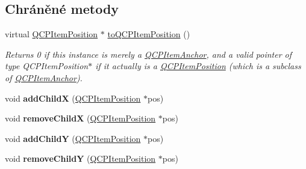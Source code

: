 \subsection*{Chráněné metody}
\begin{DoxyCompactItemize}
\item 
virtual \hyperlink{classQCPItemPosition}{Q\+C\+P\+Item\+Position} $\ast$ \hyperlink{classQCPItemAnchor_ac54b20120669950255a63587193dbb86}{to\+Q\+C\+P\+Item\+Position} ()
\begin{DoxyCompactList}\small\item\em Returns 0 if this instance is merely a \hyperlink{classQCPItemAnchor}{Q\+C\+P\+Item\+Anchor}, and a valid pointer of type Q\+C\+P\+Item\+Position$\ast$ if it actually is a \hyperlink{classQCPItemPosition}{Q\+C\+P\+Item\+Position} (which is a subclass of \hyperlink{classQCPItemAnchor}{Q\+C\+P\+Item\+Anchor}). \end{DoxyCompactList}\item 
\hypertarget{classQCPItemAnchor_aef15daa640debfb11b0aeaa2116c6fbc}{}void {\bfseries add\+Child\+X} (\hyperlink{classQCPItemPosition}{Q\+C\+P\+Item\+Position} $\ast$pos)\label{classQCPItemAnchor_aef15daa640debfb11b0aeaa2116c6fbc}

\item 
\hypertarget{classQCPItemAnchor_a230b1d494cda63458e289bbe1b642599}{}void {\bfseries remove\+Child\+X} (\hyperlink{classQCPItemPosition}{Q\+C\+P\+Item\+Position} $\ast$pos)\label{classQCPItemAnchor_a230b1d494cda63458e289bbe1b642599}

\item 
\hypertarget{classQCPItemAnchor_af05dc56f24536f0c7a9a0f57b58cea67}{}void {\bfseries add\+Child\+Y} (\hyperlink{classQCPItemPosition}{Q\+C\+P\+Item\+Position} $\ast$pos)\label{classQCPItemAnchor_af05dc56f24536f0c7a9a0f57b58cea67}

\item 
\hypertarget{classQCPItemAnchor_aa2394911d8fff3bd958b9f4f1994b64d}{}void {\bfseries remove\+Child\+Y} (\hyperlink{classQCPItemPosition}{Q\+C\+P\+Item\+Position} $\ast$pos)\label{classQCPItemAnchor_aa2394911d8fff3bd958b9f4f1994b64d}

\end{DoxyCompactItemize}
